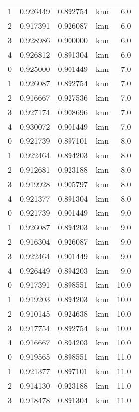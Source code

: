 \begin{tabular}{rrrlr}
     1 & 0.926449 & 0.892754 &      knn &        6.0 \\
     2 & 0.917391 & 0.926087 &      knn &        6.0 \\
     3 & 0.928986 & 0.900000 &      knn &        6.0 \\
     4 & 0.926812 & 0.891304 &      knn &        6.0 \\
     0 & 0.925000 & 0.901449 &      knn &        7.0 \\
     1 & 0.926087 & 0.892754 &      knn &        7.0 \\
     2 & 0.916667 & 0.927536 &      knn &        7.0 \\
     3 & 0.927174 & 0.908696 &      knn &        7.0 \\
     4 & 0.930072 & 0.901449 &      knn &        7.0 \\
     0 & 0.921739 & 0.897101 &      knn &        8.0 \\
     1 & 0.922464 & 0.894203 &      knn &        8.0 \\
     2 & 0.912681 & 0.923188 &      knn &        8.0 \\
     3 & 0.919928 & 0.905797 &      knn &        8.0 \\
     4 & 0.921377 & 0.891304 &      knn &        8.0 \\
     0 & 0.921739 & 0.901449 &      knn &        9.0 \\
     1 & 0.926087 & 0.894203 &      knn &        9.0 \\
     2 & 0.916304 & 0.926087 &      knn &        9.0 \\
     3 & 0.922464 & 0.901449 &      knn &        9.0 \\
     4 & 0.926449 & 0.894203 &      knn &        9.0 \\
     0 & 0.917391 & 0.898551 &      knn &       10.0 \\
     1 & 0.919203 & 0.894203 &      knn &       10.0 \\
     2 & 0.910145 & 0.924638 &      knn &       10.0 \\
     3 & 0.917754 & 0.892754 &      knn &       10.0 \\
     4 & 0.916667 & 0.894203 &      knn &       10.0 \\
     0 & 0.919565 & 0.898551 &      knn &       11.0 \\
     1 & 0.921377 & 0.897101 &      knn &       11.0 \\
     2 & 0.914130 & 0.923188 &      knn &       11.0 \\
     3 & 0.918478 & 0.891304 &      knn &       11.0 \\

\end{tabular}
